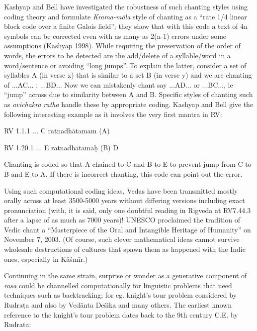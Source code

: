Kashyap and Bell have investigated the robustness of such chanting styles using coding theory and formulate \textsl{Krama-māla} style of chanting as a “rate 1/4 linear block code over a finite Galois field”; they show that with this code a text of 4n symbols can be corrected even with as many as 2(n-1) errors under some assumptions (Kashyap 1998). While requiring the preservation of the order of words, the errors to be detected are the add/delete of a syllable/word in a word/sentence or avoiding “long jumps”. To explain the latter, consider a set of syllables A (in verse x) that is similar to a set B (in verse y) and we are chanting of  ...AC... ; ...BD... Now we can mistakenly chant say ...AD... or ...BC..., ie “jump” across due to similarity between A and B. Specific styles of chanting such as \textsl{avichakra} \textsl{ratha} handle these by appropriate coding. Kashyap and Bell give the following interesting example as it involves the very first mantra in RV:

\smallskip
\begin{myquote}
RV 1.1.1     ... C ratnadhātamam (A)

RV 1.20.1    ... E ratnadhātamaḥ (B) D
\end{myquote}
\smallskip

Chanting is coded so that A chained to C and B to E to prevent jump from C to B and E to A. If there is incorrect chanting, this code can point out the error. 

Using such computational coding ideas, Vedas have been transmitted mostly orally across at least 3500-5000 years without differing versions including exact pronunciation (with, it is said, only one doubtful reading in Rigveda at RV7.44.3 after a lapse of as much as 7000 years)! UNESCO proclaimed the tradition of Vedic chant a “Masterpiece of the Oral and Intangible Heritage of Humanity” on November 7, 2003. (Of course, such clever mathematical ideas cannot survive wholesale destructions of cultures that spawn them as happened with the Indic ones, especially in Kāśmīr.)

Continuing in the same strain, surprise or wonder as a generative component of \textsl{rasa} could be channelled computationally for linguistic problems that need techniques such as backtracking; for eg. knight’s tour problem considered by Rudraṭa and also by Vedānta Deśika and many others. The earliest known reference to the knight's tour problem dates back to the 9th century C.E. by Rudrata:

